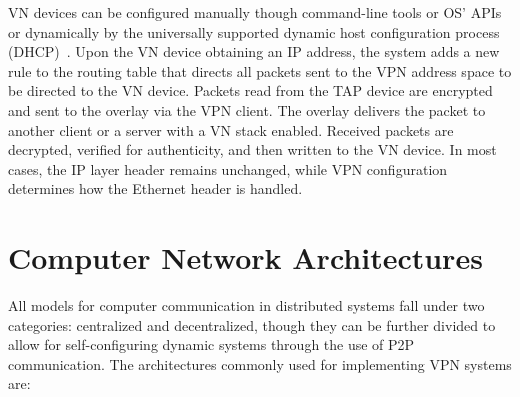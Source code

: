 VN devices can be configured manually though command-line tools or OS' APIs or
dynamically by the universally supported dynamic host configuration process
(DHCP)~\cite{dhcp0, dhcp1}.  Upon the VN device obtaining an IP address, the
system adds a new rule to the routing table that directs all packets sent to
the VPN address space to be directed to the VN device.  Packets read from the
TAP device are encrypted and sent to the overlay via the VPN client.  The
overlay delivers the packet to another client or a server with a VN stack
enabled.  Received packets are decrypted, verified for authenticity, and then
written to the VN device.  In most cases, the IP layer header remains unchanged,
while VPN configuration determines how the Ethernet header is handled.

\section{Computer Network Architectures}
All models for computer communication in distributed systems fall under two
categories:  centralized and decentralized, though they can be further
divided to allow for self-configuring dynamic systems through the use of P2P
communication.  The architectures commonly used for implementing VPN systems
are:

